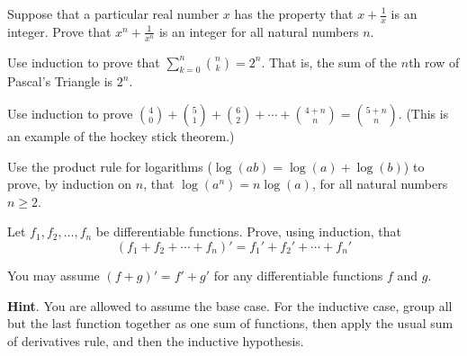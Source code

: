 \documentclass[10pt,]{book}
\theoremstyle{plain}
\theoremstyle{definition}
\theoremstyle{definition}
\theoremstyle{definition}
\theoremstyle{definition}
\numberwithin{equation}{chapter}
\def\d{\displaystyle}
\begin{document}
\begin{divisionexercise}{18}\hypertarget{exercise-273}{}
\hypertarget{p-2324}{}%
Suppose that a particular real number \(x\) has the property that \(x + \frac{1}{x}\) is an integer. Prove that \(x^n + \frac{1}{x^n}\) is an integer for all natural numbers \(n\).%
\end{divisionexercise}%
\begin{divisionexercise}{19}\hypertarget{exercise-274}{}
\hypertarget{p-2327}{}%
Use induction to prove that \(\d\sum_{k=0}^n {n \choose k} = 2^n\). That is, the sum of the \(n\)th row of Pascal's Triangle is \(2^n\).%
\end{divisionexercise}%
\begin{divisionexercise}{20}\hypertarget{exercise-275}{}
\hypertarget{p-2328}{}%
Use induction to prove \({4 \choose 0} + {5 \choose 1} + {6 \choose 2} + \cdots + {4+n \choose n} = {5+n \choose n}\). (This is an example of the hockey stick theorem.)%
\end{divisionexercise}%
\begin{divisionexercise}{21}\hypertarget{exercise-276}{}
\hypertarget{p-2329}{}%
Use the product rule for logarithms (\(\log(ab) = \log(a) + \log(b)\)) to prove, by induction on \(n\), that \(\log(a^n) = n \log(a)\), for all natural numbers \(n \ge 2\).%
\end{divisionexercise}%
\begin{divisionexercise}{22}\hypertarget{exercise-277}{}
\hypertarget{p-2332}{}%
Let \(f_1, f_2,\ldots, f_n\) be differentiable functions. Prove, using induction, that%
\begin{equation*}
(f_1 + f_2 + \cdots + f_n)' = f_1' + f_2' + \cdots + f_n'
\end{equation*}
%
\par
\hypertarget{p-2333}{}%
You may assume \((f+g)' = f' + g'\) for any differentiable functions \(f\) and \(g\).%
\par\smallskip%
\noindent\textbf{Hint}.\hypertarget{hint-97}{}\quad%
\hypertarget{p-2334}{}%
You are allowed to assume the base case. For the inductive case, group all but the last function together as one sum of functions, then apply the usual sum of derivatives rule, and then the inductive hypothesis.%
\end{divisionexercise}%
\end{document}
